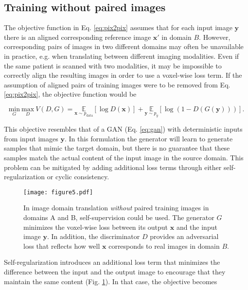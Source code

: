 \documentclass{article}
\begin{document}
\subsection{Training without paired images}
\label{sec:cyclegan}
The objective function in Eq. \ref{eq:pix2pix} assumes that for each input image $\mathbf{y}$ there is an aligned corresponding reference image $\mathbf{x'}$ in domain $B$. However, corresponding pairs of images in two different domains may often be unavailable in practice, e.g. when translating between different imaging modalities. Even if the same patient is scanned with two modalities, it may be impossible to correctly align the resulting images in order to use a voxel-wise loss term. If the assumption of aligned pairs of training images were to be removed from Eq. \ref{eq:pix2pix}, the objective function would be

\begin{equation}
\underset{G}{\text{min}}~\underset{D}{\text{max}}~V(D,G)=\underset{\mathbf{x}\sim p_{\text{data}}}{\mathds{E}} [\log{D(\mathbf{x})}] +\underset{\mathbf{y}\sim p_y}{\mathds{E}} [\log{(1-D(G(\mathbf{y})))}].
\label{eq:ucGAN}
\end{equation}

This objective resembles that of a GAN (Eq. \ref{eq:gan}) with deterministic inputs from input images $\mathbf{y}$. In this formulation the generator will learn to generate samples that mimic the target domain, but there is no guarantee that these samples match the actual content of the input image in the source domain. This problem can be mitigated by adding additional loss terms through either self-regularization or cyclic consistency.

\begin{figure}[tp]
\centering
\texttt{[image: figure5.pdf]}
\caption{In image domain translation \textit{without} paired training images in domains A and B, self-supervision could be used. The generator $G$ minimizes the voxel-wise loss between its output $\mathbf{x}$ and the input image $\mathbf{y}$. In addition, the discriminator $D$ provides an adversarial loss that reflects how well $\mathbf{x}$ corresponds to real images in domain $B$.}
\label{fig:selfreg}
\end{figure}

Self-regularization introduces an additional loss term that minimizes the difference between the input and the output image to encourage that they maintain the same content \cite{shrivastava2017learning} (Fig. \ref{fig:selfreg}). In that case, the objective becomes
\end{document}
